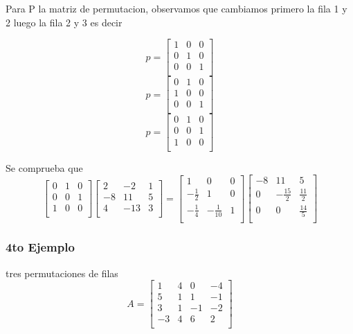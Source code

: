 \documentclass{article}
\begin{document}
Para P la matriz de permutacion, observamos que cambiamos primero la fila
1 y 2 luego la fila 2 y 3 es decir

\[
    p =
    \begin{bmatrix}
        1 & 0  & 0   \\
     0 & 1 & 0   \\
       0 & 0  & 1   \\
    \end{bmatrix}
\]
\[
    p =
    \begin{bmatrix}
        0 & 1 & 0   \\
        1 & 0  & 0   \\
       0 & 0  & 1   \\
    \end{bmatrix}
\]
\[
    p =
    \begin{bmatrix}
        0 & 1 & 0   \\
        0 & 0  & 1   \\
        1 & 0  & 0   \\
    \end{bmatrix}
\]

Se comprueba que 
\[
    \begin{bmatrix}
        0 & 1 & 0   \\
        0 & 0  & 1   \\
        1 & 0  & 0   \\
    \end{bmatrix}
    \begin{bmatrix}
        2 & -2 & 1   \\
    -8 & 11  & 5   \\
        4 & -13  & 3   \\
    \end{bmatrix}
    =
    \begin{bmatrix}
        1 & 0 & 0   \\
    -\frac{1}{2}& 1  & 0   \\
       -\frac{1}{4}  & -\frac{1}{10}  & 1   \\
    \end{bmatrix}
    \begin{bmatrix}
        -8 & 11 & 5   \\
    0 & -\frac{15}{2}  & \frac{11}{2}   \\
       0  & 0  & \frac{14}{5}   \\
    \end{bmatrix}
\]



\subsubsection{4to Ejemplo}
tres permutaciones de filas 
\[
    A=
    \begin{bmatrix}
        1 & 4 & 0 & -4   \\
        5 & 1 & 1 & -1   \\
        3 & 1 & -1 & -2   \\
        -3 & 4 & 6 & 2   \\
    \end{bmatrix}
\]
\end{document}
